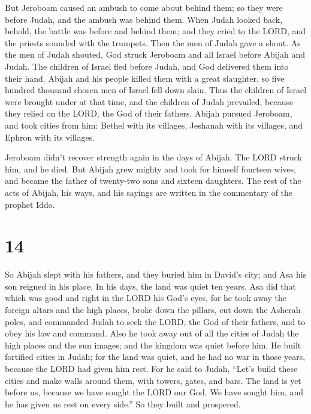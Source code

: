  But Jeroboam caused an ambush to come about behind them;
so they were before Judah, and the ambush was behind them.
 When Judah looked back, behold, the battle was before
and behind them; and they cried to the LORD, and the priests sounded
with the trumpets.  Then the men of Judah gave a shout.
As the men of Judah shouted, God struck Jeroboam and all Israel before
Abijah and Judah.  The children of Israel fled before
Judah, and God delivered them into their hand.  Abijah
and his people killed them with a great slaughter, so five hundred
thousand chosen men of Israel fell down slain.  Thus the
children of Israel were brought under at that time, and the children of
Judah prevailed, because they relied on the LORD, the God of their
fathers.  Abijah pursued Jeroboam, and took cities from
him: Bethel with its villages, Jeshanah with its villages, and Ephron
with its villages.

 Jeroboam didn't recover strength again in the days of
Abijah. The LORD struck him, and he died.  But Abijah
grew mighty and took for himself fourteen wives, and became the father
of twenty-two sons and sixteen daughters.  The rest of
the acts of Abijah, his ways, and his sayings are written in the
commentary of the prophet Iddo.

\hypertarget{section-13}{%
\section{14}\label{section-13}}

 So Abijah slept with his fathers, and they buried him in
David's city; and Asa his son reigned in his place. In his days, the
land was quiet ten years.  Asa did that which was good and
right in the LORD his God's eyes,  for he took away the
foreign altars and the high places, broke down the pillars, cut down the
Asherah poles,  and commanded Judah to seek the LORD, the
God of their fathers, and to obey his law and command. 
Also he took away out of all the cities of Judah the high places and the
sun images; and the kingdom was quiet before him.  He
built fortified cities in Judah; for the land was quiet, and he had no
war in those years, because the LORD had given him rest. 
For he said to Judah, ``Let's build these cities and make walls around
them, with towers, gates, and bars. The land is yet before us, because
we have sought the LORD our God. We have sought him, and he has given us
rest on every side.'' So they built and prospered.

